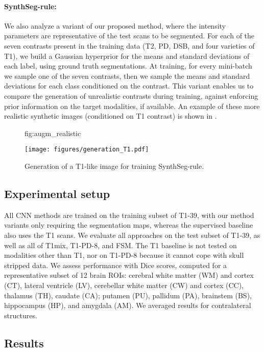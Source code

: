 \documentclass{midl}
\newcommand{\netname}{SynthSeg}
\begin{document}
\paragraph{\netname{}-rule:} We also analyze a variant of our proposed method, where the intensity parameters are representative of the test scans to be segmented. For each of the seven contrasts present in the training data (T2, PD, DSB, and four varieties of T1), we build a Gaussian hyperprior for the means and standard deviations of each label, using ground truth segmentations. At training, for every mini-batch we sample one of the seven contrasts, then we sample the means and standard deviations for each class conditioned on the contrast. This variant enables us to compare the generation of unrealistic contrasts during training, against enforcing prior information on the target modalities, if available. An example of these more realistic synthetic images (conditioned on T1 contrast) is shown in .

\begin{figure}[t]
\floatconts
  {fig:augm_realistic}
  {\caption{Generation of a T1-like image for training \netname{}-rule.}}
  {\centering\texttt{[image: figures/generation\_T1.pdf]}}
\end{figure}


\subsection{Experimental setup}

All CNN methods are trained on the training subset of T1-39, with our method variants only requiring the segmentation maps, whereas the supervised baseline also uses the T1 scans. We evaluate all approaches on the test subset of T1-39, as well as all of T1mix, T1-PD-8, and FSM. The T1 baseline is not tested on modalities other than T1, nor on T1-PD-8 because it cannot cope with skull stripped data. We assess performance with Dice scores, computed for a representative subset of 12 brain ROIs: cerebral white matter (WM) and cortex (CT), lateral ventricle (LV), cerebellar white matter (CW) and cortex (CC), thalamus (TH), caudate (CA); putamen (PU), pallidum (PA), brainstem (BS), hippocampus (HP), and amygdala (AM). We averaged results for contralateral structures. 


\subsection{Results}
\end{document}

